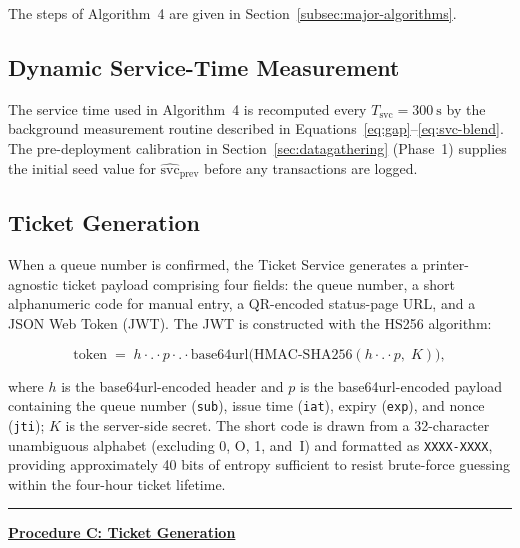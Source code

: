 \noindent The steps of Algorithm~4 are given in
Section~\ref{subsec:major-algorithms}.

\subsection{Dynamic Service-Time Measurement}
\label{subsec:service-time}

The service time used in Algorithm~4 is recomputed every
$T_{\mathrm{svc}} = 300\ \mathrm{s}$ by the background measurement
routine described in Equations~\ref{eq:gap}--\ref{eq:svc-blend}. The
pre-deployment calibration in Section~\ref{sec:datagathering}
(Phase~1) supplies the initial seed value for
$\widehat{\mathrm{svc}}_{\mathrm{prev}}$ before any transactions are
logged.

\subsection{Ticket Generation}
\label{subsec:ticket}

When a queue number is confirmed, the Ticket Service generates a
printer-agnostic ticket payload comprising four fields: the queue
number, a short alphanumeric code for manual entry, a QR-encoded
status-page URL, and a JSON Web Token (JWT). The JWT is constructed
with the HS256 algorithm:

\begin{equation}
\mathrm{token} \;=\; h \cdot \texttt{.} \cdot p \cdot \texttt{.} \cdot
\mathrm{base64url}\big(\mathrm{HMAC\text{-}SHA256}(h \cdot \texttt{.}
\cdot p,\; K)\big),
\label{eq:jwt}
\end{equation}

\noindent where $h$ is the base64url-encoded header and $p$ is the
base64url-encoded payload containing the queue number (\texttt{sub}),
issue time (\texttt{iat}), expiry (\texttt{exp}), and nonce
(\texttt{jti}); $K$ is the server-side secret. The short code is
drawn from a 32-character unambiguous alphabet (excluding 0, O, 1,
and~I) and formatted as \texttt{XXXX-XXXX}, providing approximately
40 bits of entropy sufficient to resist brute-force guessing within the
four-hour ticket lifetime.

\vspace{0.5em}
\noindent\rule{\linewidth}{0.8pt}

\noindent\textbf{\underline{Procedure C: Ticket Generation}}

